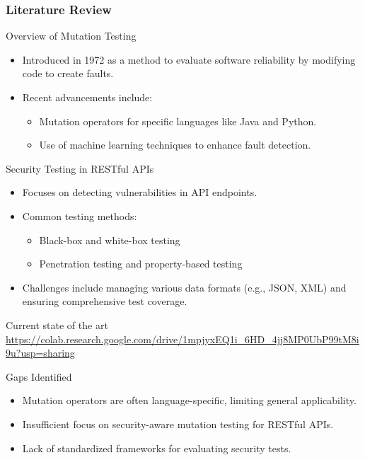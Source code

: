 \documentclass[12pt]{beamer}
\theoremstyle{remark}
\theoremstyle{definition}
\begin{document}
\begin{frame}[allowframebreaks]
\frametitle{Literature Review}
\begin{block}{Overview of Mutation Testing}
\begin{itemize}
    \item Introduced in 1972 as a method to evaluate software reliability by modifying code to create faults.
    \item Recent advancements include:
    \begin{itemize}
        \item Mutation operators for specific languages like Java and Python.
        \item Use of machine learning techniques to enhance fault detection.
    \end{itemize}
\end{itemize}
\end{block}

\begin{block}{Security Testing in RESTful APIs}
\begin{itemize}
    \item Focuses on detecting vulnerabilities in API endpoints.
    \item Common testing methods:
    \begin{itemize}
        \item Black-box and white-box testing
        \item Penetration testing and property-based testing
    \end{itemize}
    \item Challenges include managing various data formats (e.g., JSON, XML) and ensuring comprehensive test coverage.
\end{itemize}
\end{block}
\pagebreak
\begin{block}{Current state of the art}
 \url{https://colab.research.google.com/drive/1mpjyxEQ1i_6HD_4jj8MP0UbP99tM8i9u?usp=sharing}
\end{block}
\pagebreak
\begin{block}{Gaps Identified}
\begin{itemize}
    \item Mutation operators are often language-specific, limiting general applicability.
    \item Insufficient focus on security-aware mutation testing for RESTful APIs.
    \item Lack of standardized frameworks for evaluating security tests.
\end{itemize}
\end{block}
\end{frame}
\end{document}
